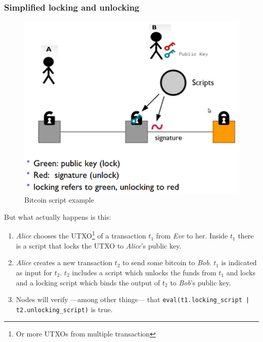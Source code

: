 \subsubsection{Simplified locking and unlocking}
\begin{figure}[htbp]
   \centering
   \includegraphics{images/bitcoin_script.png}
   \caption{Bitcoin script example}
   \label{fig:bitcoin_script}
\end{figure}

But what actually happens is this:
\begin{enumerate}
   \item \textit{Alice} chooses the UTXO\footnote{Or more UTXOs from multiple transaction} of a transaction $t_1$ from \textit{Eve} to her. Inside $t_1$ there is a script that locks the UTXO to \textit{Alice}'s public key.
   \item \textit{Alice} creates a new transaction $t_2$ to send some bitcoin to \textit{Bob}. $t_1$ is indicated as input for $t_2$. $t_2$ includes a script which unlocks the funds from $t_1$ and locks and a locking script which binds the output of $t_2$ to \textit{Bob}'s public key.
   \item Nodes will verify ---among other things--- that \lstinline{eval(t1.locking_script | t2.unlocking_script)} is true.
\end{enumerate}

